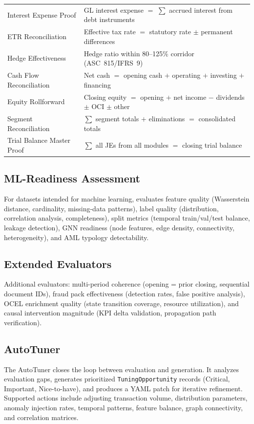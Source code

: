 \begin{table}[H]
\begin{tabular}{p{3.2cm}p{9cm}}
Interest Expense Proof &
  GL interest expense $=$ $\sum$ accrued interest from debt instruments \\
ETR Reconciliation &
  Effective tax rate $=$ statutory rate $\pm$ permanent differences \\
Hedge Effectiveness &
  Hedge ratio within 80--125\% corridor (ASC~815/IFRS~9) \\
Cash Flow Reconciliation &
  Net cash $=$ opening cash $+$ operating $+$ investing $+$ financing \\
Equity Rollforward &
  Closing equity $=$ opening $+$ net income $-$ dividends $\pm$ OCI $\pm$ other \\
Segment Reconciliation &
  $\sum$ segment totals $+$ eliminations $=$ consolidated totals \\
Trial Balance Master Proof &
  $\sum$ all JEs from all modules $=$ closing trial balance \\
\bottomrule
\end{tabular}
\end{table}

\subsection{ML-Readiness Assessment}
\label{sec:eval_ml}

For datasets intended for machine learning, \system{} evaluates
feature quality (Wasserstein distance, cardinality, missing-data
patterns), label quality (distribution, correlation analysis,
completeness), split metrics (temporal train/val/test balance, leakage
detection), GNN readiness (node features, edge density, connectivity,
heterogeneity), and AML typology detectability.

\subsection{Extended Evaluators}
\label{sec:eval_extended}

Additional evaluators: multi-period coherence (opening = prior closing,
sequential document IDs), fraud pack effectiveness (detection rates,
false positive analysis), OCEL enrichment quality (state transition
coverage, resource utilization), and causal intervention magnitude
(KPI delta validation, propagation path verification).

\subsection{AutoTuner}
\label{sec:eval_autotuner}

The AutoTuner closes the loop between evaluation and generation.  It
analyzes evaluation gaps, generates prioritized
\texttt{TuningOpportunity} records (Critical, Important, Nice-to-have),
and produces a YAML patch for iterative refinement.  Supported actions
include adjusting transaction volume, distribution parameters, anomaly
injection rates, temporal patterns, feature balance, graph connectivity,
and correlation matrices.

